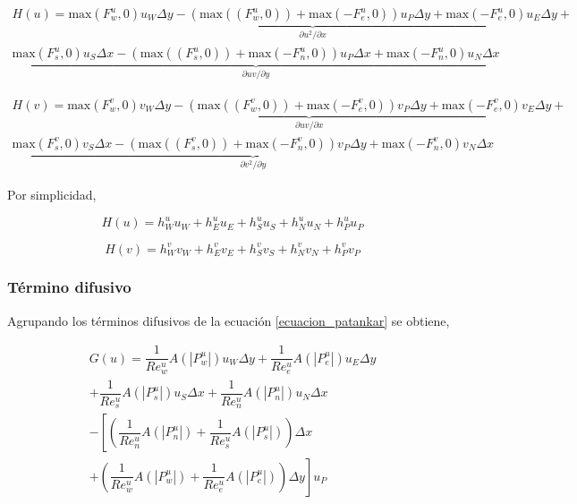 \begin{equation}
\begin{split}
H(u) = \underbrace{\mbox{max}(F_w^u,0) u_W \Delta y - (\mbox{max}((F_w^u,0)) + \mbox{max}(-F_e^u,0)) u_P \Delta y + \mbox{max}(-F_e^u,0) u_E \Delta y}_{\partial u^2 / \partial x} + \\ \underbrace{\mbox{max}(F_s^u,0) u_S \Delta x - (\mbox{max}((F_s^u,0)) + \mbox{max}(-F_n^u,0)) u_P \Delta x + \mbox{max}(-F_n^u,0) u_N \Delta x}_{\partial uv / \partial y}
\end{split}
\end{equation}

\begin{equation}
\begin{split}
H(v) =  \underbrace{\mbox{max}(F_w^v,0) v_W \Delta y - (\mbox{max}((F_w^v,0)) + \mbox{max}(-F_e^v,0)) v_P \Delta y + \mbox{max}(-F_e^v,0) v_E \Delta y}_{\partial uv / \partial x} + \\ \underbrace{\mbox{max}(F_s^v,0) v_S \Delta x - (\mbox{max}((F_s^v,0)) + \mbox{max}(-F_n^v,0)) v_P \Delta y + \mbox{max}(-F_n^v,0) v_N \Delta x}_{\partial v^2 / \partial y} 
\end{split}
\end{equation}

Por simplicidad,

\begin{equation}
H(u) = h_W^u u_W + h_E^u u_E + h_S^u u_S + h_N^u u_N + h^u_P u_P
\end{equation}

\begin{equation}
H(v) = h_W^v v_W + h_E^v v_E + h_S^v v_S + h_N^v v_N + h_P^v v_P
\end{equation}

\subsubsection{Término difusivo} \label{difusivo}

Agrupando los términos difusivos de la ecuación \ref{ecuacion_patankar} se obtiene,

\begin{equation}
\begin{split}
G(u) = \dfrac{1}{Re_w^u} A(|P_w^u|) u_W \Delta y + \dfrac{1}{Re_e^u} A(|P_e^u|) u_E \Delta y \\ + \dfrac{1}{Re_s^u} A(|P_s^u|) u_S \Delta x + \dfrac{1}{Re_n^u} A(|P_n^u|) u_N \Delta x \\ - \left[ \left( \dfrac{1}{Re_n^u} A(|P_n^u|) + \dfrac{1}{Re_s^u} A(|P_s^u|) \right) \Delta x \right. \\ + \left. \left( \dfrac{1}{Re_w^u} A(|P_w^u|) + \dfrac{1}{Re_e^u} A(|P_e^u|) \right) \Delta y \right] u_P
\end{split}
\end{equation}

